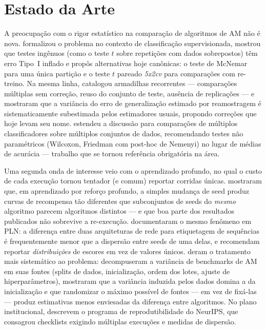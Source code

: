 \documentclass[12pt]{article}
\begin{document}
\section{Estado da Arte}\label{sec:sota}

A preocupação com o rigor estatístico na comparação de algoritmos de AM não é
nova. \cite{dietterich1998} formalizou o problema no contexto de
classificação supervisionada, mostrou que testes ingênuos (como o teste $t$
sobre repetições com dados sobrepostos) têm erro Tipo~I inflado e propôs
alternativas hoje canônicas: o teste de McNemar para uma única partição e o
teste $t$ pareado \emph{5x2cv} para comparações com re-treino. Na mesma
linha, \cite{salzberg1997} catalogou armadilhas recorrentes --- comparações
múltiplas sem correção, reuso do conjunto de teste, ausência de
replicações --- e \cite{nadeau2003} mostraram que a variância do erro de
generalização estimado por reamostragem é sistematicamente subestimada pelos
estimadores usuais, propondo correções que hoje levam seu nome.
\cite{demsar2006} estendeu a discussão para comparações de múltiplos
classificadores sobre múltiplos conjuntos de dados, recomendando testes não
paramétricos (Wilcoxon, Friedman com post-hoc de Nemenyi) no lugar de médias
de acurácia --- trabalho que se tornou referência obrigatória na área.

Uma segunda onda de interesse veio com o aprendizado profundo, no qual o
custo de cada execução tornou tentador (e comum) reportar corridas únicas.
\cite{henderson2018} mostraram que, em aprendizado por reforço profundo, a
simples mudança de seed produz curvas de recompensa tão diferentes que
subconjuntos de seeds do \emph{mesmo} algoritmo parecem algoritmos distintos
--- e que boa parte dos resultados publicados não sobrevive a re-execução.
\cite{reimers2017} documentaram o mesmo fenômeno em PLN: a diferença entre
duas arquiteturas de rede para etiquetagem de sequências é frequentemente
menor que a dispersão entre seeds de uma delas, e recomendam reportar
\emph{distribuições} de escores em vez de valores únicos.
\cite{bouthillier2021} deram o tratamento mais sistemático ao problema:
decompuseram a variância de benchmarks de AM em suas fontes (splits de
dados, inicialização, ordem dos lotes, ajuste de hiperparâmetros), mostraram
que a variância induzida pelos dados domina a da inicialização e que
randomizar o máximo possível de fontes --- em vez de fixá-las --- produz
estimativas menos enviesadas da diferença entre algoritmos. No plano
institucional, \cite{pineau2021} descrevem o programa de reprodutibilidade
do NeurIPS, que consagrou checklists exigindo múltiplas execuções e medidas
de dispersão.
\end{document}
